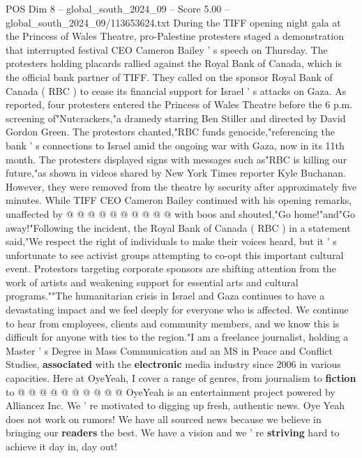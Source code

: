 \begin{textsample}{POS Dim 8 – global\_south\_2024\_09 – Score 5.00 – global\_south\_2024\_09/113653624.txt}  \label{ex:f8_pos_281}
During the TIFF opening night gala at the Princess of Wales Theatre, pro-Palestine protesters staged a demonstration that interrupted festival CEO Cameron Bailey ' s speech on Thursday.
The protesters holding placards rallied against the Royal Bank of Canada, which is the official bank partner of TIFF.
They called on the sponsor Royal Bank of Canada ( RBC ) to cease its financial support for Israel ' s attacks on Gaza.
As reported, four protesters entered the Princess of Wales Theatre before the 6 p.m. screening of"Nutcrackers,"a dramedy starring Ben Stiller and directed by David Gordon Green.
The protestors chanted,"RBC funds genocide,"referencing the bank ' s connections to Israel amid the ongoing war with Gaza, now in its 11th month.
The protesters displayed signs with messages such as"RBC is killing our future,"as shown in videos shared by New York Times reporter Kyle Buchanan.
However, they were removed from the theatre by security after approximately five minutes.
While TIFF CEO Cameron Bailey continued with his opening remarks, unaffected by @ @ @ @ @ @ @ @ @ @ with boos and shouted,"Go home!"and"Go away!"Following the incident, the Royal Bank of Canada ( RBC ) in a statement said,"We respect the right of individuals to make their voices heard, but it ' s unfortunate to see activist groups attempting to co-opt this important cultural event.
Protestors targeting corporate sponsors are shifting attention from the work of artists and weakening support for essential arts and cultural programs.""The humanitarian crisis in Israel and Gaza continues to have a devastating impact and we feel deeply for everyone who is affected.
We continue to hear from employees, clients and community members, and we know this is difficult for anyone with ties to the region."I am a freelance journalist, holding a Master ' s Degree in Mass Communication and an MS in Peace and Conflict Studies, \textbf{associated} with the \textbf{electronic} media industry since 2006 in various capacities.
Here at OyeYeah, I cover a range of genres, from journalism to \textbf{fiction} to @ @ @ @ @ @ @ @ @ @ OyeYeah is an entertainment project powered by Alliancez Inc.
We ' re motivated to digging up fresh, authentic news.
Oye Yeah does not work on rumors!
We have all sourced news because we believe in bringing our \textbf{readers} the best.
We have a vision and we ' re \textbf{striving} hard to achieve it day in, day out!

\end{textsample}
